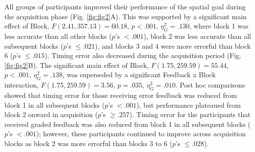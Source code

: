 \documentclass[
  man, donotrepeattitle,floatsintext]{apa7}
\begin{document}
All groups of participants improved their performance of the spatial goal during the acquisition phase (Fig. \ref{fig:fig2}A). This was supported by a significant main effect of Block, \(F(2.41,357.13) = 60.18\), \(p < .001\), \(\eta_{G}^2 = .130\), where block 1 was less accurate than all other blocks (\(p\)'s \(< .001\)), block 2 was less accurate than all subsequent blocks (\(p\)'s \(\leq .021\)), and blocks 3 and 4 were more errorful than block 6 (\(p\)'s \(\leq .015\)). Timing error also decreased during the acquisition period (Fig. \ref{fig:fig2}B). The significant main effect of Block, \(F(1.75,259.59) = 55.44\), \(p < .001\), \(\eta_{G}^2 = .138\), was superseded by a significant Feedback x Block interaction, \(F(1.75, 259.59) = 3.56\), \(p = .035\), \(\eta_{G}^2 = .010\). Post hoc comparisons showed that timing error for those receiving error feedback was reduced from block 1 in all subsequent blocks (\(p\)'s \(< .001\)), but performance plateaued from block 2 onward in acquisition (\(p\)'s \(\geq .257\)). Timing error for the participants that received graded feedback was also reduced from block 1 in all subsequent blocks (\(p\)'s \(< .001\)); however, these participants continued to improve across acquisition blocks as block 2 was more errorful than blocks 3 to 6 (\(p\)'s \(\leq .028\)).

\vspace{2ex}
\end{document}
